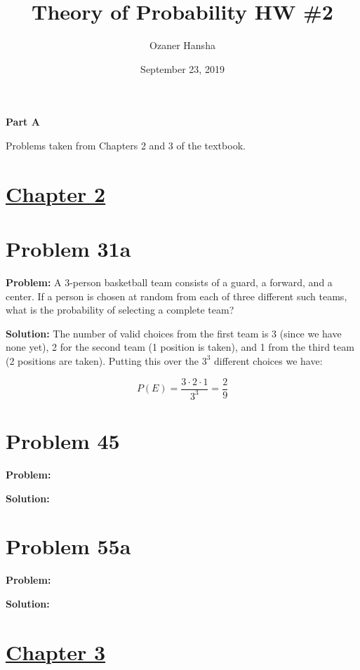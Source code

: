 \documentclass{article}
\begin{document}
\title{Theory of Probability HW \#2}
\author{Ozaner Hansha}
\date{September 23, 2019}
\maketitle

\begin{center}
    \Large{\textbf{Part A}}
\end{center}
Problems taken from Chapters 2 and 3 of the textbook.

\section*{\underline{Chapter 2}}

\section*{Problem 31a}
\noindent\textbf{Problem:} A 3-person basketball team consists of a guard, a forward, and a center. If a person is chosen at random from each of three different such teams, what is the probability of selecting a complete team?
\bigskip

\noindent\textbf{Solution:} The number of valid choices from the first team is 3 (since we have none yet), 2 for the second team (1 position is taken), and 1 from the third team (2 positions are taken). Putting this over the $3^3$ different choices we have:

\begin{equation*}
    P(E)=\frac{3\cdot2\cdot 1}{3^3}=\frac{2}{9}
\end{equation*}

\section*{Problem 45}
\noindent\textbf{Problem:} 
\bigskip

\noindent\textbf{Solution:} 
\bigskip

\section*{Problem 55a}
\noindent\textbf{Problem:} 
\bigskip

\noindent\textbf{Solution:}

\section*{\underline{Chapter 3}}
\end{document}
